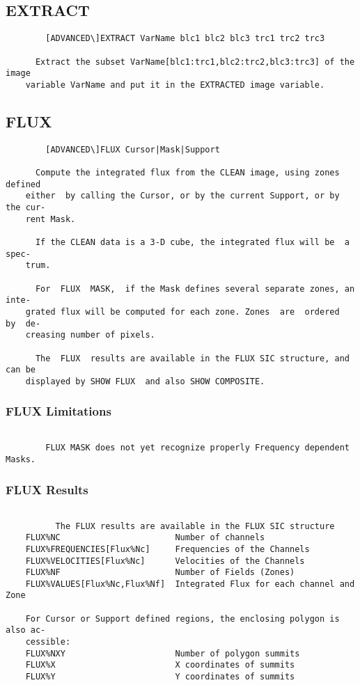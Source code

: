 \subsection{EXTRACT}
\begin{verbatim}
        [ADVANCED\]EXTRACT VarName blc1 blc2 blc3 trc1 trc2 trc3

      Extract the subset VarName[blc1:trc1,blc2:trc2,blc3:trc3] of the image
    variable VarName and put it in the EXTRACTED image variable.

\end{verbatim}
\subsection{FLUX}
\begin{verbatim}
        [ADVANCED\]FLUX Cursor|Mask|Support

      Compute the integrated flux from the CLEAN image, using zones  defined
    either  by calling the Cursor, or by the current Support, or by the cur-
    rent Mask.

      If the CLEAN data is a 3-D cube, the integrated flux will be  a  spec-
    trum.

      For  FLUX  MASK,  if the Mask defines several separate zones, an inte-
    grated flux will be computed for each zone. Zones  are  ordered  by  de-
    creasing number of pixels.

      The  FLUX  results are available in the FLUX SIC structure, and can be
    displayed by SHOW FLUX  and also SHOW COMPOSITE.

\end{verbatim}
\subsubsection{FLUX Limitations}
\begin{verbatim}

        FLUX MASK does not yet recognize properly Frequency dependent Masks.

\end{verbatim}
\subsubsection{FLUX Results}
\begin{verbatim}

          The FLUX results are available in the FLUX SIC structure
    FLUX%NC                       Number of channels
    FLUX%FREQUENCIES[Flux%Nc]     Frequencies of the Channels
    FLUX%VELOCITIES[Flux%Nc]      Velocities of the Channels
    FLUX%NF                       Number of Fields (Zones)
    FLUX%VALUES[Flux%Nc,Flux%Nf]  Integrated Flux for each channel and Zone

    For Cursor or Support defined regions, the enclosing polygon is also ac-
    cessible:
    FLUX%NXY                      Number of polygon summits
    FLUX%X                        X coordinates of summits
    FLUX%Y                        Y coordinates of summits

\end{verbatim}
